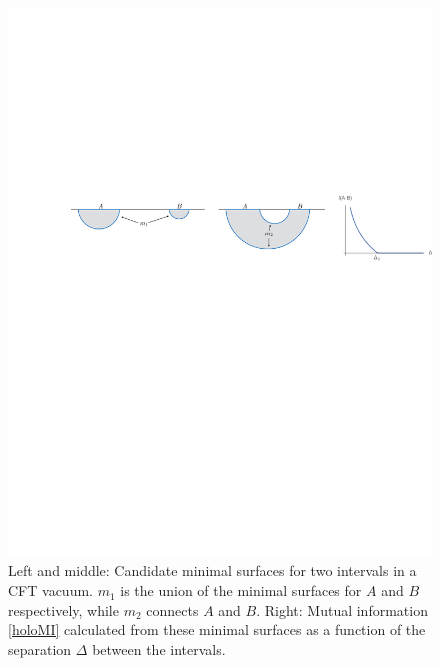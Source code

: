 \documentclass[11pt]{article}
\begin{document}
\begin{figure}[tbp]
\centering
\includegraphics[width=\textwidth]{figs/twointervals}
\caption{\label{fig:twointervals}
Left and middle: Candidate minimal surfaces for two intervals in a CFT vacuum. $m_1$ is the union of the minimal surfaces for $A$ and $B$ respectively, while $m_2$ connects $A$ and $B$. Right: Mutual information \eqref{holoMI} calculated from these minimal surfaces as a function of the separation $\Delta$ between the intervals.
}
\end{figure}
\end{document}
